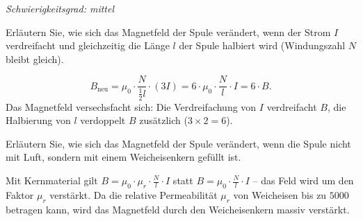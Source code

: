 \documentclass[addpoints,11pt,a4paper]{exam}
\newlength{\antwortraumlen}
\newcommand{\Antwortraum}[1]{%
  \pgfmathsetlength{\antwortraumlen}{#1*2.5cm}%
  \begin{answerbox}
    \rule{0pt}{\antwortraumlen}%
  \end{answerbox}%
}
\newcommand{\Schwierigkeit}[1]{%
  \textit{\color{darkgray}Schwierigkeitsgrad: #1}\par\smallskip
}
\begin{document}
\begin{questions}
\begin{taskbox}
\Schwierigkeit{mittel}
\question[2] Erläutern Sie, wie sich das Magnetfeld der Spule verändert,
wenn der Strom $I$ verdreifacht und gleichzeitig die Länge $l$ der Spule
halbiert wird (Windungszahl $N$ bleibt gleich).
\Antwortraum{2}
\begin{solution}
\[
  B_{\text{neu}} = \mu_0\cdot\frac{N}{\frac{1}{2}l}\cdot(3I) = 6\cdot\mu_0\cdot\frac{N}{l}\cdot I = 6\cdot B.
\]
Das Magnetfeld versechsfacht sich: Die Verdreifachung von $I$ verdreifacht
$B$, die Halbierung von $l$ verdoppelt $B$ zusätzlich ($3\times2=6$).
\end{solution}

\question[2] Erläutern Sie, wie sich das Magnetfeld der Spule verändert,
wenn die Spule nicht mit Luft, sondern mit einem Weicheisenkern gefüllt
ist.
\Antwortraum{2}
\begin{solution}
Mit Kernmaterial gilt $B=\mu_0\cdot\mu_r\cdot\frac{N}{l}\cdot I$ statt
$B=\mu_0\cdot\frac{N}{l}\cdot I$ -- das Feld wird um den Faktor $\mu_r$
verstärkt. Da die relative Permeabilität $\mu_r$ von Weicheisen bis zu
$5000$ betragen kann, wird das Magnetfeld durch den Weicheisenkern
massiv verstärkt.
\end{solution}
\end{taskbox}
\end{questions}
\end{document}
